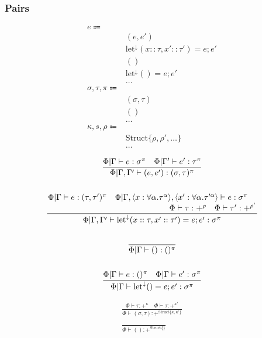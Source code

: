 \documentclass {article}
\begin{document}
\subsubsection{Pairs}
\begin{align*}
e \Coloneqq & \\
& (e, e') \tag{Pair Introduction} \\
& \text{let}^\downarrow (x :: \tau, x' :: \tau') = e; e' \tag{Pair Elimination} \\
& () \tag{Unit Introduction} \\
& \text{let}^\downarrow () = e; e' \tag{Unit Elimination} \\
& \dots \\
\sigma, \tau, \pi \Coloneqq & \\
& (\sigma, \tau) \tag{Pair} \\
& () \tag{Unit} \\
& \dots \\
\kappa, s, \rho \Coloneqq & \\
& \text{Struct} \{ \rho, \rho', \dots \} \tag{Struct Representation} \\
& \dots
\end{align*}

\begin{gather*}
\frac
{\Phi | \Gamma \vdash e : \sigma^\pi \quad \Phi | \Gamma' \vdash e' : \tau^\pi}
{\Phi | \Gamma, \Gamma' \vdash (e, e') : (\sigma, \tau)^\pi } \\
\\
\frac
{\splitfrac{\Phi | \Gamma \vdash e : (\tau, \tau')^\pi \quad \Phi | \Gamma , \langle x : \forall \alpha. \tau^\alpha \rangle, \langle x' : \forall \alpha. \tau'^\alpha \rangle \vdash e : \sigma^\pi}
{\Phi \vdash \tau : +^{\rho} \quad \Phi \vdash \tau' : +^{\rho'} }}
{\Phi | \Gamma, \Gamma' \vdash \text{let}^\downarrow (x :: \tau, x' :: \tau') = e; e' : \sigma^\pi} \\
\\
\frac
{}
{\Phi | \Gamma \vdash () : ()^\pi} \\
\\
\frac
{\Phi | \Gamma \vdash e : ()^\pi \quad \Phi | \Gamma \vdash e' : \sigma^\pi}
{\Phi | \Gamma \vdash \text{let}^\downarrow () = e; e' : \sigma^\pi}
\end{gather*}

\begin{gather*}
\frac
{\Phi \vdash \tau : +^{\kappa} \quad \Phi \vdash \tau : +^{\kappa'} }
{\Phi \vdash (\sigma, \tau) : +^{\text{Struct} \{ \kappa,\kappa'\}}} \\
\\
\frac
{}
{\Phi \vdash () : +^{\text{Struct} \{\}}}
\end{gather*}
\end{document}
